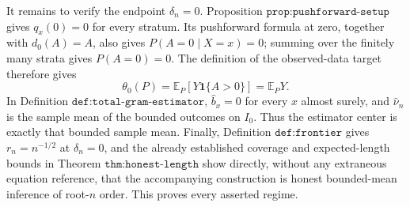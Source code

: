 It remains to verify the endpoint \(\delta_n=0\).  Proposition \(\texttt{prop:pushforward-setup}\) gives \(q_x(0)=0\) for every stratum.  Its pushforward formula at zero, together with \(d_0(A)=A\), also gives \(P(A=0\mid X=x)=0\); summing over the finitely many strata gives \(P(A=0)=0\).  The definition of the observed-data target therefore gives
\[
 \theta_0(P)=\mathbb E_P[Y\mathbf 1\{A>0\}]=\mathbb E_PY.
\]
In Definition \(\texttt{def:total-gram-estimator}\), \(\widehat b_x=0\) for every \(x\) almost surely, and \(\widehat\nu_n\) is the sample mean of the bounded outcomes on \(I_0\).  Thus the estimator center is exactly that bounded sample mean.  Finally, Definition \(\texttt{def:frontier}\) gives \(r_n=n^{-1/2}\) at \(\delta_n=0\), and the already established coverage and expected-length bounds in Theorem \(\texttt{thm:honest-length}\) show directly, without any extraneous equation reference, that the accompanying construction is honest bounded-mean inference of root-\(n\) order.  This proves every asserted regime.